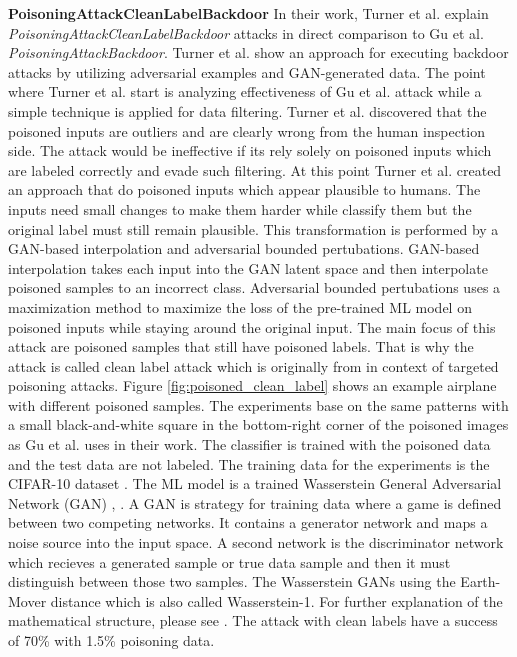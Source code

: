 \textbf{PoisoningAttackCleanLabelBackdoor} In their work, Turner et al. \cite{turner2018clean} explain \textit{PoisoningAttackCleanLabelBackdoor} attacks in direct comparison to Gu et al. \textit{PoisoningAttackBackdoor}. Turner et al. show an approach for executing backdoor attacks by utilizing adversarial examples and GAN-generated data. The point where Turner et al. start is analyzing effectiveness of Gu et al. attack while a simple technique is applied for data filtering. Turner et al. discovered that the poisoned inputs are outliers and are clearly wrong from the human inspection side. The attack would be ineffective if its rely solely on poisoned inputs which are labeled correctly and evade such filtering. At this point Turner et al. created an approach that do poisoned inputs which appear plausible to humans. The inputs need small changes to make them harder while classify them but the original label must still remain plausible. This transformation is performed by a GAN-based interpolation and adversarial bounded pertubations. GAN-based interpolation takes each input into the GAN latent space \cite{DBLP:conf/nips/GoodfellowPMXWOCB14} and then interpolate poisoned samples to an incorrect class. Adversarial bounded pertubations uses a maximization method to maximize the loss of the pre-trained ML model on poisoned inputs while staying around the original input. The main focus of this attack are poisoned samples that still have poisoned labels. That is why the attack is called clean label attack which is originally from \cite{DBLP:journals/corr/abs-1804-00792} in context of targeted poisoning attacks. Figure \ref{fig:poisoned_clean_label} shows an example airplane with different poisoned samples. The experiments base on the same patterns with a small black-and-white square in the bottom-right corner of the poisoned images as Gu et al. uses in their work. The classifier is trained with the poisoned data and the test data are not labeled. The training data for the experiments is the CIFAR-10 dataset \cite{Krizhevsky2009LearningML}. The ML model is a trained Wasserstein General Adversarial Network (GAN) \cite{DBLP:journals/corr/ArjovskyCB17}, \cite{DBLP:conf/nips/GulrajaniAADC17}. A GAN is strategy for training data where a game is defined between two competing networks. It contains a generator network and maps a noise source into the input space. A second network is the discriminator network which recieves a generated sample or true data sample and then it must distinguish between those two samples. The Wasserstein GANs using the Earth-Mover distance which is also called Wasserstein-1. For
further explanation of the mathematical structure, please see \cite{DBLP:journals/corr/GulrajaniAADC17}. The attack with clean labels have a success of 70\% with 1.5\% poisoning data.

